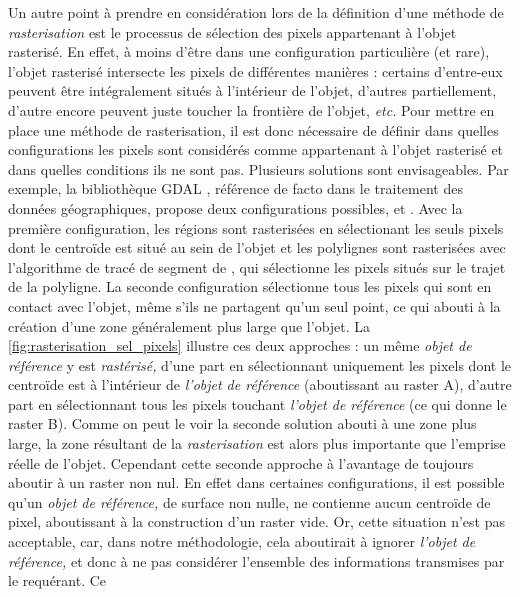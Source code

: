 Un autre point à prendre en considération lors de la définition d'une
méthode de \emph{rasterisation} est le processus de sélection des
pixels appartenant à l'objet rasterisé. En effet, à moins d’être dans
une configuration particulière (et rare), l'objet rasterisé intersecte
les pixels de différentes manières : certains d'entre-eux peuvent être
intégralement situés à l'intérieur de l'objet, d'autres partiellement,
d'autre encore peuvent juste toucher la frontière de l'objet,
\emph{etc.} Pour mettre en place une méthode de rasterisation, il est
donc nécessaire de définir dans quelles configurations les pixels sont
considérés comme appartenant à l'objet rasterisé et dans quelles
conditions ils ne sont pas. Plusieurs solutions sont
envisageables. Par exemple, la bibliothèque GDAL \autocite{GDAL2020},
référence de facto dans le traitement des données géographiques,
propose deux configurations possibles,
 et
. Avec la première
configuration, les régions sont rasterisées en sélectionant les seuls
pixels dont le centroïde est situé au sein de l'objet et les
polylignes sont rasterisées avec l'algorithme de tracé de segment de
\textcite{Bresenham1965}, qui sélectionne les pixels situés sur le
trajet de la polyligne. La seconde configuration sélectionne tous les
pixels qui sont en contact avec l'objet, même s'ils ne partagent qu'un
seul point, ce qui abouti à la création d'une zone généralement plus
large que l'objet. La \autoref{fig:rasterisation_sel_pixels} illustre
ces deux approches : un même \emph{objet de référence} y est
\emph{rastérisé,} d'une part en sélectionnant uniquement les pixels
dont le centroïde est à l'intérieur de \emph{l'objet de référence}
(aboutissant au raster \textcolor{RdBu-9-1}{\textsf{A}}), d'autre part
en sélectionnant tous les pixels touchant \emph{l'objet de référence}
(ce qui donne le raster \textcolor{RdBu-9-9}{\textsf{B}}). Comme on
peut le voir la seconde solution abouti à une zone plus large, la zone
résultant de la \emph{rasterisation} est alors plus importante que
l'emprise réelle de l'objet. Cependant cette seconde approche à
l'avantage de toujours aboutir à un raster non nul. En effet dans
certaines configurations, il est possible qu'un \emph{objet de
  référence,} de surface non nulle, ne contienne aucun centroïde de
pixel, aboutissant à la construction d'un raster vide. Or, cette
situation n'est pas acceptable, car, dans notre méthodologie, cela
aboutirait à ignorer \emph{l'objet de référence,} et donc à ne pas
considérer l'ensemble des informations transmises par le requérant. Ce
